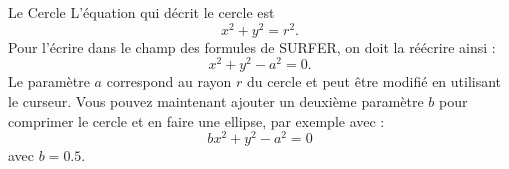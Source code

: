 \begin{surferPage}[Cercle]{Le Cercle}
L'équation qui décrit le cercle est 
\[x^2+y^2=r^2.\]
Pour l'écrire dans le champ des formules de SURFER, on doit la réécrire ainsi :
\[x^2+y^2-a^2=0.\]
Le paramètre $a$ correspond au rayon $r$ du cercle et peut être modifié en utilisant le curseur. Vous pouvez maintenant ajouter un deuxième paramètre $b$ pour comprimer le cercle et en faire une ellipse, par exemple avec :
\[bx^2+y^2-a^2=0\] avec $b=0.5$.
\end{surferPage}

